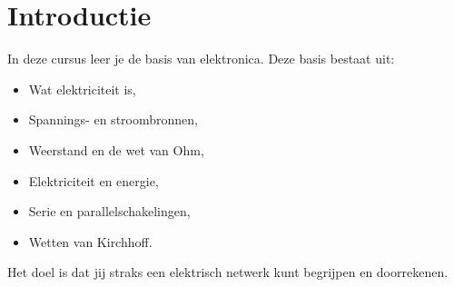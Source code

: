 \chapter*{Introductie}

In deze cursus leer je de basis van elektronica. Deze basis bestaat uit:
\begin{itemize}[nolistsep, noitemsep]
	\item Wat elektriciteit is,
	\item Spannings- en stroombronnen,
	\item Weerstand en de wet van Ohm,
	\item Elektriciteit en energie,
	\item Serie en parallelschakelingen,
	\item Wetten van Kirchhoff.
\end{itemize} 

\bigbreak
Het doel is dat jij straks een elektrisch netwerk kunt begrijpen en doorrekenen.
